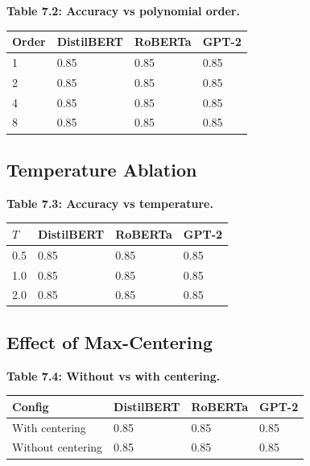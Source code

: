 \textbf{Table 7.2: Accuracy vs polynomial order.}

\begin{table}[H]
\centering
\small
\begin{tabular}{llll}
\toprule
\textbf{Order} & \textbf{DistilBERT} & \textbf{RoBERTa} & \textbf{GPT-2} \\
\midrule
1 & 0.85 & 0.85 & 0.85 \\
2 & 0.85 & 0.85 & 0.85 \\
4 & 0.85 & 0.85 & 0.85 \\
8 & 0.85 & 0.85 & 0.85 \\
\bottomrule
\end{tabular}
\end{table}

\subsection{Temperature Ablation}

\textbf{Table 7.3: Accuracy vs temperature.}

\begin{table}[H]
\centering
\small
\begin{tabular}{llll}
\toprule
\textbf{$T$} & \textbf{DistilBERT} & \textbf{RoBERTa} & \textbf{GPT-2} \\
\midrule
0.5 & 0.85 & 0.85 & 0.85 \\
1.0 & 0.85 & 0.85 & 0.85 \\
2.0 & 0.85 & 0.85 & 0.85 \\
\bottomrule
\end{tabular}
\end{table}

\subsection{Effect of Max-Centering}

\textbf{Table 7.4: Without vs with centering.}

\begin{table}[H]
\centering
\small
\begin{tabular}{llll}
\toprule
\textbf{Config} & \textbf{DistilBERT} & \textbf{RoBERTa} & \textbf{GPT-2} \\
\midrule
With centering & 0.85 & 0.85 & 0.85 \\
Without centering & 0.85 & 0.85 & 0.85 \\
\bottomrule
\end{tabular}
\end{table}

